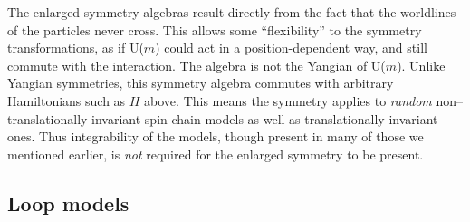 \documentclass[twocolumn,floats,pra]{revtex4}
\begin{document}
The enlarged symmetry algebras result directly from the fact that
the worldlines of the particles never cross. This allows some
``flexibility'' to the symmetry transformations, as if U($m$)
could act in a position-dependent way, and still commute with the
interaction. The algebra is not the Yangian of U($m$). Unlike
Yangian symmetries, this symmetry algebra commutes with arbitrary
Hamiltonians such as $H$ above. This means the symmetry applies to
{\em random} non--translationally-invariant spin chain models as
well as translationally-invariant ones. Thus integrability of the
models, though present in many of those we mentioned earlier, is
{\em not} required for the enlarged symmetry to be present.

\subsection{Loop models}
\end{document}
